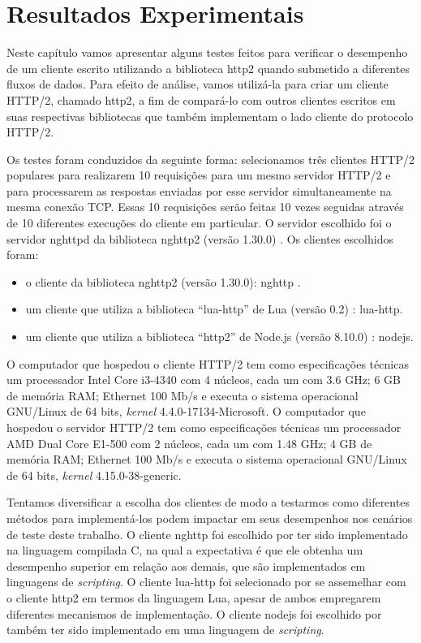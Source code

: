 \chapter{Resultados Experimentais}
\label{cap:results}

Neste capítulo vamos apresentar alguns testes feitos para verificar o desempenho de um cliente escrito utilizando a biblioteca http2 quando submetido a diferentes fluxos de dados. Para efeito de análise, vamos utilizá-la para criar um cliente HTTP/2, chamado http2, a fim de compará-lo com outros clientes escritos em suas respectivas bibliotecas que também implementam o lado cliente do protocolo HTTP/2.

Os testes foram conduzidos da seguinte forma: selecionamos três clientes HTTP/2 populares para realizarem 10 requisições para um mesmo servidor HTTP/2 e para processarem as respostas enviadas por esse servidor simultaneamente na mesma conexão TCP. Essas 10 requisições serão feitas 10 vezes seguidas através de 10 diferentes execuções do cliente em particular. O servidor escolhido foi o servidor nghttpd da biblioteca nghttp2 (versão 1.30.0) \cite{nghttp2}. Os clientes escolhidos foram:

\begin{itemize}
    \item o cliente da biblioteca nghttp2 (versão 1.30.0): nghttp \cite{nghttp2}.
    \item um cliente que utiliza a biblioteca ``lua-http'' de Lua (versão 0.2) \cite{DaurminatorLuaHTTP}: lua-http.
    \item um cliente que utiliza a biblioteca ``http2'' de Node.js (versão 8.10.0) \cite{Nodejs}: nodejs.
\end{itemize}

O computador que hospedou o cliente HTTP/2 tem como especificações técnicas um processador Intel Core i3-4340 com 4 núcleos, cada um com 3.6 GHz; 6 GB de memória RAM; Ethernet 100 Mb/s e executa o sistema operacional GNU/Linux de 64 bits, {\em kernel} 4.4.0-17134-Microsoft. O computador que hospedou o servidor HTTP/2 tem como especificações técnicas um processador AMD Dual Core E1-500 com 2 núcleos, cada um com 1.48 GHz; 4 GB de memória RAM; Ethernet 100 Mb/s e  executa o sistema operacional GNU/Linux de 64 bits, {\em kernel} 4.15.0-38-generic.

Tentamos diversificar a escolha dos clientes de modo a testarmos como diferentes métodos para implementá-los podem impactar em seus desempenhos nos cenários de teste deste trabalho. O cliente nghttp foi escolhido por ter sido implementado na linguagem compilada C, na qual a expectativa é que ele obtenha um desempenho superior em relação aos demais, que são implementados em linguagens de {\em scripting}. O cliente lua-http foi selecionado por se assemelhar com o cliente http2 em termos da linguagem Lua, apesar de ambos empregarem diferentes mecanismos de implementação. O cliente nodejs foi escolhido por também ter sido implementado em uma linguagem de {\em scripting}.

